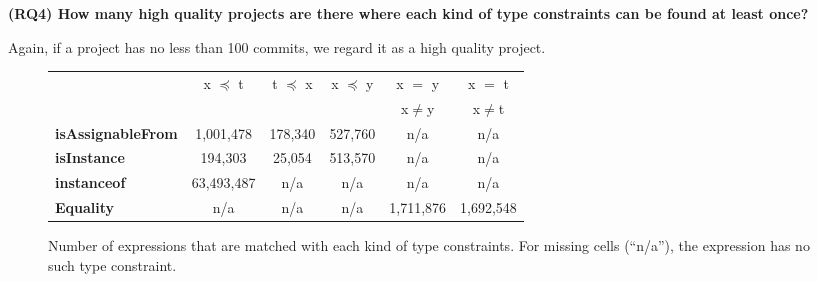 \textbf{(RQ4) How many high quality projects are there where each kind of type constraints can be found at least once?}

Again, if a project has no less than 100 commits, we regard it as a high quality project. 





\begin{figure*}[tb]
\begin{center}
\begin{small}
\begin{tabular}{|l|c|c|c|c|c|}
\hline
& \multirow{2}{*}{x $\preceq$ t} &\multirow{2}{*}{t $\preceq$ x}& \multirow{2}{*}{x $\preceq$  y }& x $=$ y & x $=$ t
\\&&&&x$\neq$y&x$\neq$t\\
\hline
\hline
\textbf{isAssignableFrom} & 1,001,478 & 178,340 & 527,760 & n/a &n/a\\
\textbf{isInstance}&194,303 & 25,054 & 513,570&n/a&n/a\\
\textbf{instanceof} &63,493,487&n/a&n/a&n/a&n/a\\
\textbf{Equality}&n/a&n/a&n/a& 1,711,876&1,692,548 \\
\hline
\end{tabular}
\end{small}
\end{center}
\caption{Number of expressions that are matched with each kind of type constraints. For missing cells (``n/a''), the expression has no such type constraint. }
\label{fig:exprnumber}
\end{figure*}

